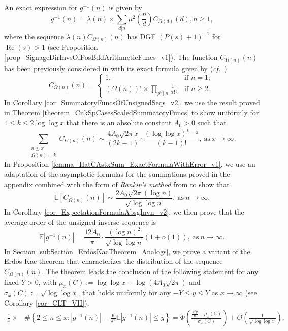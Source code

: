 \documentclass[11pt,reqno,a4letter]{article}
\numberwithin{figure}{section}
\numberwithin{table}{section}
\newcommand{\cf}{\textit{cf.\ }}
\theoremstyle{plain}
\numberwithin{theorem}{section}
\theoremstyle{definition}
\renewcommand{\Re}{\operatorname{Re}}
\begin{document}
An exact expression for $g^{-1}(n)$ is given by 
\[
g^{-1}(n) = \lambda(n) \times \sum_{d|n} \mu^2\left(\frac{n}{d}\right) C_{\Omega(d)}(d), n \geq 1,  
\]
where the sequence $\lambda(n) C_{\Omega(n)}(n)$ has DGF $(P(s)+1)^{-1}$ for $\Re(s) > 1$ 
(see Proposition \ref{prop_SignageDirInvsOfPosBddArithmeticFuncs_v1}). 
The function $C_{\Omega(n)}(n)$ has been previously considered in 
\cite{FROBERG-1968} with its exact formula 
given by (\cf \cite{CLT-RANDOM-ORDERED-FACTS-2011}) 
\[
C_{\Omega(n)}(n) = \begin{cases}
     1, & \text{if $n = 1$; } \\ 
     (\Omega(n))! \times \prod\limits_{p^{\alpha}||n} \frac{1}{\alpha!}, & \text{if $n \geq 2$. }
     \end{cases}
\]
In Corollary \ref{cor_SummatoryFuncsOfUnsignedSeqs_v2}, 
we use the result proved in 
Theorem \ref{theorem_CnkSpCasesScaledSummatoryFuncs} 
to show uniformly for $1 \leq k \leq 2\log\log x$ that there is an absolute 
constant $A_0 > 0$ such that 
\[
\sum_{\substack{n \leq x \\ \Omega(n)=k}} C_{\Omega(n)}(n) \sim 
     \frac{4 A_0 \sqrt{2\pi} x}{(2k-1)} \cdot \frac{(\log\log x)^{k-\frac{1}{2}}}{(k-1)!}, 
     \mathrm{\ as\ } x \rightarrow \infty. 
\]
In Proposition \ref{lemma_HatCAstxSum_ExactFormulaWithError_v1}, 
we use an adaptation of the asymptotic formulas for the summations proved in the appendix 
combined with the form of \emph{Rankin's method} from \cite[Thm.~7.20]{MV} to show that 
\[
\mathbb{E}[C_{\Omega(n)}(n)] \sim \frac{2 A_0 \sqrt{2\pi} (\log n)}{\sqrt{\log\log n}}, 
     \mathrm{\ as\ } n \rightarrow \infty. 
\]
In Corollary \ref{cor_ExpectationFormulaAbsgInvn_v2}, we then prove that 
the average order of the unsigned inverse sequence is 
\[
\mathbb{E}|g^{-1}(n)| = \frac{12A_0}{\pi} \cdot \frac{(\log n)^2}{\sqrt{\log\log n}} (1+o(1)),  
     \mathrm{\ as\ } n \rightarrow \infty. 
\]
In Section \ref{subSection_ErdosKacTheorem_Analogs}, 
we prove a variant of the Erd\H{o}s-Kac theorem 
that characterizes the distribution of the sequence $C_{\Omega(n)}(n)$. 
The theorem leads the conclusion of the following statement for any fixed $Y > 0$, with 
$\mu_x(C) := \log\log x - \log\left(4A_0\sqrt{2\pi}\right)$ and 
$\sigma_x(C) := \sqrt{\log\log x}$, 
that holds uniformly for any $-Y \leq y \leq Y$ 
as $x \rightarrow \infty$ (see Corollary \ref{cor_CLT_VII}): 
\begin{align*}
\frac{1}{x} \times & \#\left\{2 \leq n \leq x:|g^{-1}(n)| - 
     \frac{6}{\pi^2} \mathbb{E}|g^{-1}(n)| \leq y\right\} = 
     \Phi\left(\frac{\frac{\pi^2 y}{6}-\mu_x(C)}{\sigma_x(C)}\right) + 
     O\left(\frac{1}{\sqrt{\log\log x}}\right). 
\end{align*}
\end{document}
